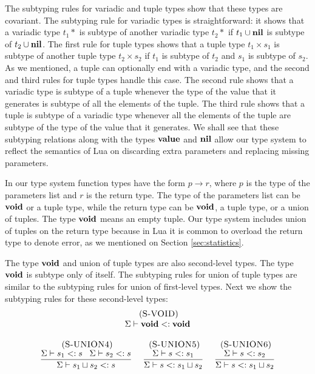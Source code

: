 The subtyping rules for variadic and tuple types show that
these types are covariant.
The subtyping rule for variadic types is straightforward:
it shows that a variadic type $t_{1}*$ is subtype of another
variadic type $t_{2}*$ if $t_{1} \cup \mathbf{nil}$ is subtype of
$t_{2} \cup \mathbf{nil}$.
The first rule for tuple types shows that a tuple type
$t_{1} \times s_{1}$ is subtype of another tuple type
$t_{2} \times s_{2}$ if $t_{1}$ is subtype of $t_{2}$
and $s_{1}$ is subtype of $s_{2}$.
As we mentioned, a tuple can optionally end with a variadic
type, and the second and third rules for tuple types handle
this case.
The second rule shows that a variadic type is subtype of
a tuple whenever the type of the value that it generates is subtype
of all the elements of the tuple.
The third rule shows that a tuple is subtype of a variadic
type whenever all the elements of the tuple are subtype of the
type of the value that it generates.
We shall see that these subtyping relations along with the
types $\mathbf{value}$ and $\mathbf{nil}$ allow our type system to reflect
the semantics of Lua on discarding extra parameters and
replacing missing parameters.

In our type system function types have the form $p \rightarrow r$,
where $p$ is the type of the parameters list and $r$ is the
return type.
The type of the parameters list can be $\mathbf{void}$ or a tuple type,
while the return type can be $\mathbf{void}$, a tuple type, or a union of tuples.
The type $\mathbf{void}$ means an empty tuple.
Our type system includes union of tuples on the return type because
in Lua it is common to overload the return type to denote error,
as we mentioned on Section \ref{sec:statistics}.

The type $\mathbf{void}$ and union of tuple types are also second-level types.
The type $\mathbf{void}$ is subtype only of itself.
The subtyping rules for union of tuple types are similar to the
subtyping rules for union of first-level types.
Next we show the subtyping rules for these second-level types:
\[
\begin{array}{c}
\begin{array}{c}
\; (\textsc{S-VOID})\\
\Sigma \vdash \mathbf{void} <: \mathbf{void}
\end{array}
\\ \\
\begin{array}{c}
\; (\textsc{S-UNION4})\\
\dfrac{\Sigma \vdash s_{1} <: s \;\;\;
       \Sigma \vdash s_{2} <: s}
      {\Sigma \vdash s_{1} \sqcup s_{2} <: s}
\end{array}
\;
\begin{array}{c}
\; (\textsc{S-UNION5})\\
\dfrac{\Sigma \vdash s <: s_{1}}
      {\Sigma \vdash s <: s_{1} \sqcup s_{2}}
\end{array}
\;
\begin{array}{c}
\; (\textsc{S-UNION6})\\
\dfrac{\Sigma \vdash s <: s_{2}}
      {\Sigma \vdash s <: s_{1} \sqcup s_{2}}
\end{array}
\end{array}
\]

